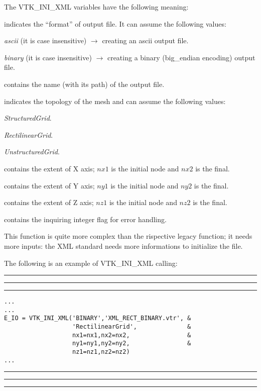 \documentclass[pagesize=pdftex,fontsize=10pt,paper=a4,oneside]{scrbook}
\DeclareRobustCommand{\MarginNote}[1]{\marginpar{%
\slshape\footnotesize%
\parindent=0pt\lineskip=0pt\lineskiplimit=0pt%
\tolerance=2000\hyphenpenalty=300\exhyphenpenalty=300%
\doublehyphendemerits=100000\finalhyphendemerits=\doublehyphendemerits%
\raggedright\hspace{0pt}#1}}
\newenvironment{boxred}[1]%
               {%
                \noindent\hspace*{-0.025\textwidth}%
                \color{Maroon}%
                \rule[-5.8pt]{0.6pt}{6pt}\hspace*{-0.6pt}\rule{1.05\textwidth}{0.6pt}\hspace*{-0.6pt}\rule[-5.8pt]{0.6pt}{6pt}%
                \color{black}%
                \vspace*{0.6pt}\MarginNote{\color{Maroon}{#1}}%
               }%
               {%
                \noindent\hspace*{-0.025\textwidth}%
                \color{Maroon}%
                \rule[0pt]{0.6pt}{6pt}\hspace*{-0.6pt}\rule{1.05\textwidth}{0.6pt}\hspace*{-0.6pt}\rule[0pt]{0.6pt}{6pt}%
                \color{black}%
                \vspace*{2mm}%
               }
\newenvironment{enumerateABlu}%
{\def\theenumi{\textsc{\EnumFont\color{RoyalBlue}\Alph{enumi}}}%
\enumerate}%
{\endenumerate}
\newcommand{\virgo}[1]{``{#1}''}
\begin{document}
The VTK\_INI\_XML variables have the following meaning:

\begin{description}
\item[{\color{RoyalBlue}output\_format}] indicates the \virgo{format} of output file. It can assume the following values:
 \begin{enumerateABlu}
  \item \emph{ascii} (it is case insensitive) $\rightarrow$ creating an ascii output file.
  \item \emph{binary} (it is case insensitive) $\rightarrow$ creating a binary (big\_endian encoding) output file.
 \end{enumerateABlu}
 \item[{\color{RoyalBlue}filename}] contains the name (with its path) of the output file.
 \item[{\color{RoyalBlue}topology}] indicates the topology of the mesh and can assume the following values:
 \begin{enumerateABlu}
  \item \emph{StructuredGrid}.
  \item \emph{RectilinearGrid}.
  \item \emph{UnstructuredGrid}.
 \end{enumerateABlu}
 \item[{\color{RoyalBlue}nx1,nx2}] contains the extent of X axis; $nx1$ is the initial node and $nx2$ is the final.
 \item[{\color{RoyalBlue}ny1,ny2}] contains the extent of Y axis; $ny1$ is the initial node and $ny2$ is the final.
 \item[{\color{RoyalBlue}nz1,nz2}] contains the extent of Z axis; $nz1$ is the initial node and $nz2$ is the final.
 \item[{\color{RoyalBlue}E\_IO}] contains the inquiring integer flag for error handling.
\end{description}

This function is quite more complex than the rispective legacy function; it needs more inputs: the XML standard needs more
informations to initialize the file.

The following is an example of VTK\_INI\_XML calling:

\begin{boxred}{VTK\_INI\_XML Calling}
\begin{verbatim}
...
...
E_IO = VTK_INI_XML('BINARY','XML_RECT_BINARY.vtr', &
                   'RectilinearGrid',              &
                   nx1=nx1,nx2=nx2,                &
                   ny1=ny1,ny2=ny2,                &
                   nz1=nz1,nz2=nz2)
...
\end{verbatim}
\end{boxred}
\end{document}
